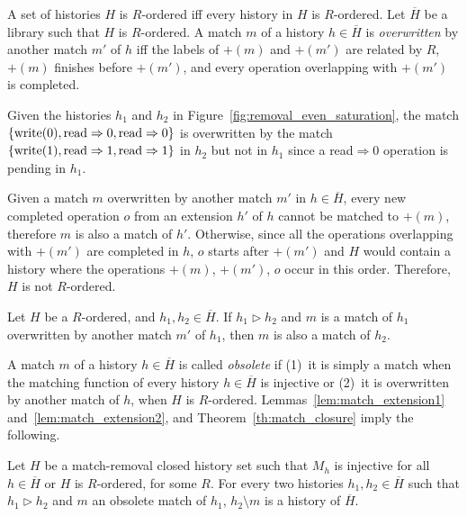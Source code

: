 A set of histories $H$ is $R$-ordered iff every history in $H$ is $R$-ordered.
Let $\overline{H}$ be a library such that $H$ is $R$-ordered. A match $m$ of a
history $h\in \overline{H}$ is \emph{overwritten} by another match $m'$ of $h$
iff the labels of $+(m)$ and $+(m')$ are related by $R$, $+(m)$ finishes before
$+(m')$, and every operation overlapping with $+(m')$ is completed.

\begin{example}

  Given the histories $h_1$ and $h_2$ in
  Figure~\ref{fig:removal_even_saturation}, the match ${\{  \text{write}(0),
  \text{read}\Rightarrow 0, \text{read}\Rightarrow0  \}}$ is overwritten by the
  match ${\{  \text{write}(1), \text{read}\Rightarrow 1,
  \text{read}\Rightarrow1  \}}$ in $h_2$ but not in $h_1$ since a read$\Rightarrow
  0$ operation is pending in $h_1$.

\end{example}

Given a match $m$ overwritten by another match $m'$ in $h\in \overline{H}$,
every new completed operation $o$ from an extension $h'$ of $h$ cannot be
matched to $+(m)$, therefore $m$ is also a match of $h'$. Otherwise, since all
the operations overlapping with $+(m')$ are completed in $h$, $o$ starts after
$+(m')$ and $H$ would contain a history where the operations $+(m)$, $+(m')$,
$o$ occur in this order. Therefore, $H$ is not $R$-ordered.

\begin{lemma}
  \label{lem:match_extension2}

  Let $H$ be a $R$-ordered, and $h_1, h_2\in \overline{H}$. If $h_1 \vartriangleright h_2$ and
  $m$ is a match of $h_1$ overwritten by another match $m'$ of $h_1$, then $m$
  is also a match of $h_2$.

\end{lemma}

A match $m$ of a history $h\in \overline{H}$ is called \emph{obsolete} if
(1)~it is simply a match when the matching function of every history $h\in
\overline{H}$ is injective or (2)~it is overwritten by another match of $h$,
when $H$ is $R$-ordered. Lemmas~\ref{lem:match_extension1}
and~\ref{lem:match_extension2}, and Theorem~\ref{th:match_closure} imply the
following.

\begin{corollary}
  \label{cor:matching_final}

  Let $H$ be a match-removal closed history set such that $M_h$ is injective
  for all $h\in \overline{H}$ or $H$ is $R$-ordered, for some $R$. For every
  two histories $h_1, h_2\in \overline{H}$ such that $h_1 \vartriangleright
  h_2$ and $m$ an obsolete match of $h_1$, $h_2\setminus m$ is a history of
  $\overline{H}$.

\end{corollary}


